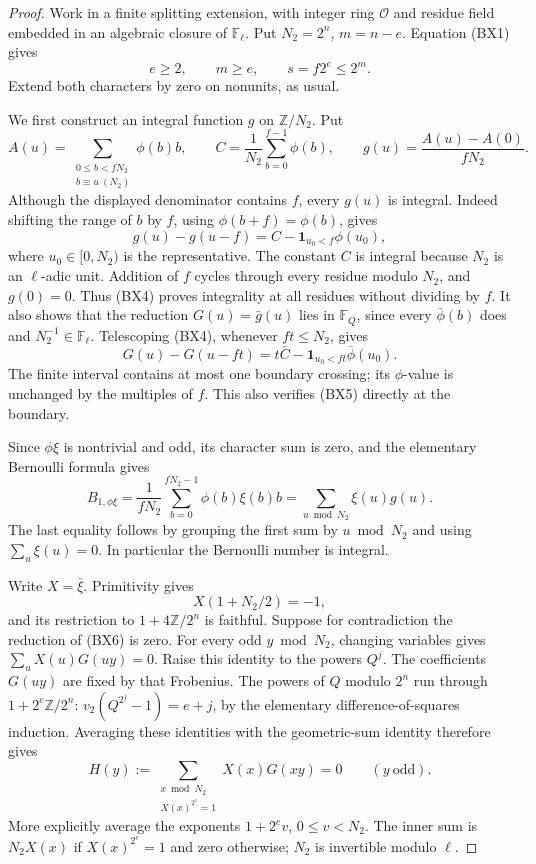 \begin{proof}
Work in a finite splitting extension, with integer ring
\(\mathcal O\) and residue field embedded in an algebraic
closure of \(\mathbb F_\ell\).
Put \(N_2=2^n\), \(m=n-e\).
Equation (BX1) gives
\[
               e\ge2,\qquad m\ge e,\qquad
                         s=f2^e\le2^m .
 \tag{BX2}
\]
Extend both characters by zero on nonunits, as usual.

We first construct an integral function \(g\) on
\(\mathbb Z/N_2\).
Put
\[
 A(u)=\sum_{\substack{0\le b<fN_2\\b\equiv u\ (N_2)}}\phi(b)b,
 \qquad C=\frac1{N_2}\sum_{b=0}^{f-1}\phi(b),\qquad
                  g(u)=\frac{A(u)-A(0)}{fN_2}.
 \tag{BX3}
\]
Although the displayed denominator contains \(f\), every
\(g(u)\) is integral.
Indeed shifting the range of \(b\) by \(f\), using
\(\phi(b+f)=\phi(b)\), gives
\[
              g(u)-g(u-f)
                       =C-\mathbf1_{u_0<f}\phi(u_0),
 \tag{BX4}
\]
where \(u_0\in[0,N_2)\) is the representative.
The constant \(C\) is integral because \(N_2\) is an
\(\ell\)-adic unit.
Addition of \(f\) cycles through every residue modulo
\(N_2\), and \(g(0)=0\).
Thus (BX4) proves integrality at all residues without
dividing by \(f\).
It also shows that the reduction \(G(u)=\bar g(u)\)
lies in \(\mathbb F_Q\), since every \(\bar\phi(b)\)
does and \(N_2^{-1}\in\mathbb F_\ell\).
Telescoping (BX4), whenever \(ft\le N_2\), gives
\[
        G(u)-G(u-ft)
               =t\bar C-\mathbf1_{u_0<ft}\bar\phi(u_0).
 \tag{BX5}
\]
The finite interval contains at most one boundary crossing;
its \(\phi\)-value is unchanged by the multiples of \(f\).
This also verifies (BX5) directly at the boundary.

Since \(\phi\xi\) is nontrivial and odd, its character sum
is zero, and the elementary Bernoulli formula gives
\[
 B_{1,\phi\xi}
   =\frac1{fN_2}\sum_{b=0}^{fN_2-1}\phi(b)\xi(b)b
   =\sum_{u\bmod N_2}\xi(u)g(u).
 \tag{BX6}
\]
The last equality follows by grouping the first sum by
\(u\bmod N_2\) and using \(\sum_u\xi(u)=0\).
In particular the Bernoulli number is integral.

Write \(X=\bar\xi\).
Primitivity gives
\[
             X(1+N_2/2)=-1,
 \tag{BX7}
\]
and its restriction to \(1+4\mathbb Z/2^n\) is faithful.
Suppose for contradiction the reduction of (BX6) is zero.
For every odd \(y\bmod N_2\), changing variables gives
\(\sum_uX(u)G(uy)=0\).
Raise this identity to the powers \(Q^j\).
The coefficients \(G(uy)\) are fixed by that Frobenius.
The powers of \(Q\) modulo \(2^n\) run through
\(1+2^e\mathbb Z/2^n\):
\(v_2(Q^{2^j}-1)=e+j\), by the elementary
difference-of-squares induction.
Averaging these identities with the geometric-sum
identity therefore gives
\[
 H(y):=\sum_{\substack{x\bmod N_2\\X(x)^{2^e}=1}}
                                      X(x)G(xy)=0
                         \qquad(y\ \text{odd}).
 \tag{BX8}
\]
More explicitly average the exponents \(1+2^ev\),
\(0\le v<N_2\).
The inner sum is \(N_2X(x)\) if \(X(x)^{2^e}=1\)
and zero otherwise; \(N_2\) is invertible modulo \(\ell\).


\end{proof}
